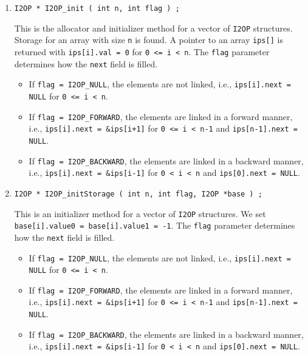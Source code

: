 \begin{enumerate}
\item
\begin{verbatim}
I2OP * I2OP_init ( int n, int flag ) ;
\end{verbatim}
This is the allocator and initializer method for a vector of 
{\tt I2OP} structures.
Storage for an array with size {\tt n} is found.
A pointer to an array {\tt ips[]} is returned
with {\tt ips[i].val = 0} for {\tt 0 <= i < n}.
The {\tt flag} parameter determines how the {\tt next} field
is filled.
\begin{itemize}
\item
If {\tt flag = I2OP\_NULL}, the elements are not linked,
i.e., {\tt ips[i].next = NULL} 
for {\tt 0 <= i < n}.
\item
If {\tt flag = I2OP\_FORWARD}, 
the elements are linked in a forward manner,
i.e., {\tt ips[i].next = \&ips[i+1]} 
for {\tt 0 <= i < n-1} and {\tt ips[n-1].next = NULL}.
\item
If {\tt flag = I2OP\_BACKWARD}, 
the elements are linked in a backward manner,
i.e., {\tt ips[i].next = \&ips[i-1]} 
for {\tt 0 < i < n} and {\tt ips[0].next = NULL}.
\end{itemize}
\item
\begin{verbatim}
I2OP * I2OP_initStorage ( int n, int flag, I2OP *base ) ;
\end{verbatim}
This is an initializer method for a vector of 
{\tt I2OP} structures.
We set {\tt base[i].value0 = base[i].value1 = -1}.
The {\tt flag} parameter determines how the {\tt next} field
is filled.
\begin{itemize}
\item
If {\tt flag = I2OP\_NULL}, the elements are not linked,
i.e., {\tt ips[i].next = NULL} 
for {\tt 0 <= i < n}.
\item
If {\tt flag = I2OP\_FORWARD}, 
the elements are linked in a forward manner,
i.e., {\tt ips[i].next = \&ips[i+1]} 
for {\tt 0 <= i < n-1} and {\tt ips[n-1].next = NULL}.
\item
If {\tt flag = I2OP\_BACKWARD}, 
the elements are linked in a backward manner,
i.e., {\tt ips[i].next = \&ips[i-1]} 
for {\tt 0 < i < n} and {\tt ips[0].next = NULL}.
\end{itemize}

\end{enumerate}

